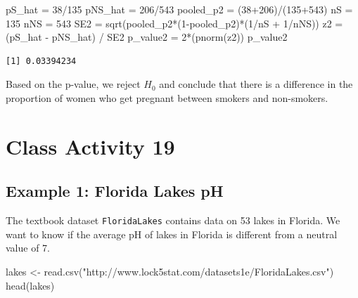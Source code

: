 \documentclass[
]{book}
\newenvironment{Shaded}{\begin{snugshade}}{\end{snugshade}}
\newcommand{\DecValTok}[1]{\textcolor[rgb]{0.00,0.00,0.81}{#1}}
\newcommand{\FunctionTok}[1]{\textcolor[rgb]{0.00,0.00,0.00}{#1}}
\newcommand{\NormalTok}[1]{#1}
\newcommand{\OtherTok}[1]{\textcolor[rgb]{0.56,0.35,0.01}{#1}}
\newcommand{\SpecialCharTok}[1]{\textcolor[rgb]{0.00,0.00,0.00}{#1}}
\newcommand{\StringTok}[1]{\textcolor[rgb]{0.31,0.60,0.02}{#1}}
\begin{document}
\begin{Shaded}
\begin{Highlighting}[]
\NormalTok{pS\_hat }\OtherTok{=} \DecValTok{38}\SpecialCharTok{/}\DecValTok{135}
\NormalTok{pNS\_hat }\OtherTok{=} \DecValTok{206}\SpecialCharTok{/}\DecValTok{543}
\NormalTok{pooled\_p2 }\OtherTok{=}\NormalTok{ (}\DecValTok{38}\SpecialCharTok{+}\DecValTok{206}\NormalTok{)}\SpecialCharTok{/}\NormalTok{(}\DecValTok{135}\SpecialCharTok{+}\DecValTok{543}\NormalTok{)}
\NormalTok{nS }\OtherTok{=} \DecValTok{135}
\NormalTok{nNS }\OtherTok{=} \DecValTok{543}
\NormalTok{SE2 }\OtherTok{=} \FunctionTok{sqrt}\NormalTok{(pooled\_p2}\SpecialCharTok{*}\NormalTok{(}\DecValTok{1}\SpecialCharTok{{-}}\NormalTok{pooled\_p2)}\SpecialCharTok{*}\NormalTok{(}\DecValTok{1}\SpecialCharTok{/}\NormalTok{nS }\SpecialCharTok{+} \DecValTok{1}\SpecialCharTok{/}\NormalTok{nNS))}
\NormalTok{z2 }\OtherTok{=}\NormalTok{ (pS\_hat }\SpecialCharTok{{-}}\NormalTok{ pNS\_hat) }\SpecialCharTok{/}\NormalTok{ SE2}
\NormalTok{p\_value2 }\OtherTok{=} \DecValTok{2}\SpecialCharTok{*}\NormalTok{(}\FunctionTok{pnorm}\NormalTok{(z2))}
\NormalTok{p\_value2}
\end{Highlighting}
\end{Shaded}

\begin{verbatim}
[1] 0.03394234
\end{verbatim}

Based on the p-value, we reject \(H_0\) and conclude that there is a difference in the proportion of women who get pregnant between smokers and non-smokers.

\hypertarget{class-activity-19}{%
\chapter{Class Activity 19}\label{class-activity-19}}

\hypertarget{example-1-florida-lakes-ph}{%
\section{Example 1: Florida Lakes pH}\label{example-1-florida-lakes-ph}}

The textbook dataset \texttt{FloridaLakes} contains data on 53 lakes in Florida. We want to know if the average pH of lakes in Florida is different from a neutral value of 7.

\begin{Shaded}
\begin{Highlighting}[]
\NormalTok{lakes }\OtherTok{\textless{}{-}} \FunctionTok{read.csv}\NormalTok{(}\StringTok{"http://www.lock5stat.com/datasets1e/FloridaLakes.csv"}\NormalTok{)}
\FunctionTok{head}\NormalTok{(lakes)}
\end{Highlighting}
\end{Shaded}
\end{document}
